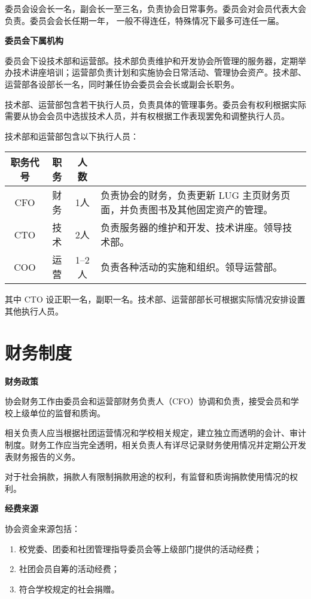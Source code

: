 	委员会设会长一名，副会长一至三名，负责协会日常事务。委员会对会员代表大会负责。委员会会长任期一年， 一般不得连任，特殊情况下最多可连任一届。
	
	\term \textbf{委员会下属机构}
	
	委员会下设技术部和运营部。技术部负责维护和开发协会所管理的服务器，定期举办技术讲座培训；运营部负责计划和实施协会日常活动、管理协会资产。技术部、运营部各设部长一名，同时兼任协会委员会会长或副会长职务。
	
	技术部、运营部包含若干执行人员，负责具体的管理事务。委员会有权利根据实际需要从协会会员中选拔技术人员，并有权根据工作表现罢免和调整执行人员。
	
	技术部和运营部包含以下执行人员：
	
	\begin{table}[H]
		\centering
		\begin{tabularx}{\textwidth}{cccX}
			\toprule
			\textbf{职务代号} & \textbf{职务} & \textbf{人数} & \centercell{\textbf{职责}} \\
			\midrule
			CFO & 财务 & 1人 & 负责协会的财务，负责更新 LUG 主页财务页面，并负责图书及其他固定资产的管理。 \\
			CTO & 技术 & 2人 & 负责服务器的维护和开发、技术讲座。领导技术部。 \\
			COO & 运营 & 1--2人 & 负责各种活动的实施和组织。领导运营部。\\
			\bottomrule
		\end{tabularx}
	\end{table}
	
	其中 CTO 设正职一名，副职一名。技术部、运营部部长可根据实际情况安排设置其他执行人员。
	
	\section{财务制度}
	
	\term \textbf{财务政策}
	
	协会财务工作由委员会和运营部财务负责人（CFO）协调和负责，接受会员和学校上级单位的监督和质询。
	
	相关负责人应当根据社团运营情况和学校相关规定，建立独立而透明的会计、审计制度。财务工作应当完全透明，相关负责人有详尽记录财务使用情况并定期公开发表财务报告的义务。
	
	对于社会捐款，捐款人有限制捐款用途的权利，有监督和质询捐款使用情况的权利。
	
	\term \textbf{经费来源}
	
	协会资金来源包括：
	
	\begin{enumerate}
		\item 校党委、团委和社团管理指导委员会等上级部门提供的活动经费；
		\item 社团会员自筹的活动经费；
		\item 符合学校规定的社会捐赠。
	\end{enumerate}
	
